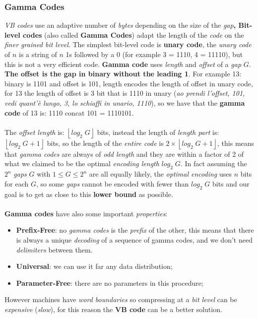 \documentclass{article}
\begin{document}
\subsubsection{Gamma Codes}
\emph{VB codes} use an adaptive number of \emph{bytes} depending on the size of the \emph{gap}\textbf{, Bit-level codes} (also called \textbf{Gamma Codes}) adapt the length of the \emph{code} on the \emph{finer grained bit level}. The simplest bit-level code is \textbf{unary code}, the \emph{unary code} of $n$ is a string of $n$ 1s followed by a 0 (for example 3 = 1110, 4 = 11110), but this is not a very efficient code. \textbf{Gamma code} uses \emph{length} and \emph{offset} of a \emph{gap} $G$. \textbf{The offset is the gap in binary without the leading 1}. For example 13: binary is 1101 and offset is 101, length encodes the length of offset in unary code, for 13 the length of offset is 3 bit that is 1110 in unary (\emph{ao prendi l'offset, 101, vedi quant'è lungo, 3, lo schiaffi in unario, 1110}), so we have that the \textbf{gamma code} of 13 is: 1110 concat 101 = 1110101. \\\\
The \emph{offset length} is:  $\left \lfloor log_2\; G \right \rfloor $ bits, instead the length of \emph{length part} is: $\left \lfloor log_2\; G +1 \right \rfloor $ bits, so the length of the \emph{entire code} is $2 \times \left \lfloor log_2\; G +1 \right \rfloor $, this means that \emph{gamma codes} are always of \emph{odd length} and they are within a factor of 2 of what we claimed to be the optimal \emph{encoding length} $log_2 \;G$. In fact assuming the $2^n$ \emph{gaps} $G$ with $1 \leq G \leq 2^n$ are all equally likely, the\emph{ optimal encoding} uses $n$ bits for each $G$, so some \emph{gaps} cannot be encoded with fewer than $log_2\; G$ bits and our goal is to get as close to this \textbf{lower bound} as possible.
\\\\
\textbf{Gamma codes} have also some important \emph{properties}:
\begin{itemize}
\item \textbf{Prefix-Free}: no \emph{gamma codes} is the \emph{prefix} of the other, this means that there is always a unique \emph{decoding} of a sequence of gamma codes, and we don't need \emph{delimiters} between them.
\item \textbf{Universal}: we can use it far any data distribution;
\item \textbf{Parameter-Free}: there are no parameters in this procedure;
\end{itemize}
However machines have \emph{word boundaries} so compressing at a \emph{bit level} can be \emph{expensive} (\emph{slow}), for this reason the \textbf{VB code} can be a better solution. 
\clearpage
\end{document}
